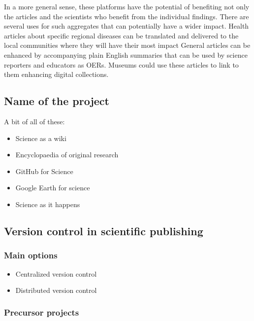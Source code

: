 \documentclass[final,authoryear,3p]{elsarticle-open-drafting}
\begin{document}
In a more general sense, these platforms have the potential of benefiting not only the articles and the scientists who benefit from the individual findings. There are several uses for such aggregates that can potentially have a wider impact. 
Health articles about specific regional diseases can be translated and delivered to the local communities where they will have their most impact
General articles can be enhanced by accompanying plain English summaries that can be used by science reporters and educators as OERs. 
Museums could use these articles to link to them enhancing digital collections. 


\subsection{Name of the project}
A bit of all of these:
\begin{itemize}
	\item Science as a wiki
	\item Encyclopaedia of original research
	\item GitHub for Science
	\item Google Earth for science
	\item Science as it happens
\end{itemize}
\subsection{Version control in scientific publishing}
\subsubsection{Main options}
\begin{itemize}
	\item Centralized version control
	\item Distributed version control
\end{itemize}
	
\subsubsection{Precursor projects}
\end{document}
